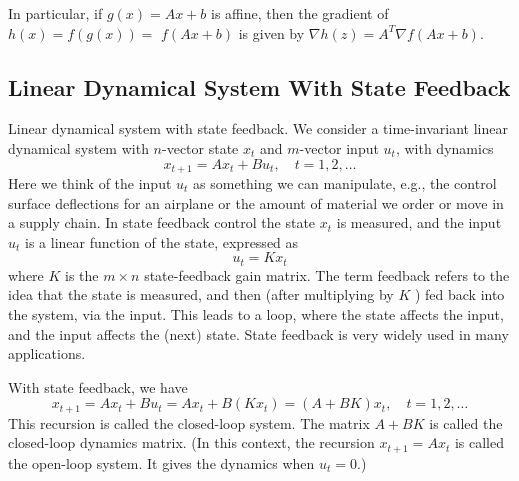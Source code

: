 In particular, if $ g(x)=A x+b $ is affine, then the gradient of $ h(x)=f(g(x))= $ $ f(A x+b) $ is given by $ \nabla h(z)=A^{T} \nabla f(A x+b) $.

\subsection{Linear Dynamical System With State Feedback}

Linear dynamical system with state feedback. We consider a time-invariant linear dynamical system with $ n $-vector state $ x_{t} $ and $ m $-vector input $ u_{t} $, with dynamics
\begin{equation}
x_{t+1}=A x_{t}+B u_{t}, \quad t=1,2, \ldots
\end{equation}
Here we think of the input $ u_{t} $ as something we can manipulate, e.g., the control surface deflections for an airplane or the amount of material we order or move in a supply chain. In state feedback control the state $ x_{t} $ is measured, and the input $ u_{t} $ is a linear function of the state, expressed as
\begin{equation}
u_{t}=K x_{t}
\end{equation}
where $ K $ is the $ m \times n $ state-feedback gain matrix. The term feedback refers to the idea that the state is measured, and then (after multiplying by $ K $ ) fed back into the system, via the input. This leads to a loop, where the state affects the input, and the input affects the (next) state. State feedback is very widely used in many applications. 

With state feedback, we have
\begin{equation}
x_{t+1}=A x_{t}+B u_{t}=A x_{t}+B\left(K x_{t}\right)=(A+B K) x_{t}, \quad t=1,2, \ldots
\end{equation}
This recursion is called the closed-loop system. The matrix $ A+B K $ is called the closed-loop dynamics matrix. (In this context, the recursion $ x_{t+1}=A x_{t} $ is called the open-loop system. It gives the dynamics when $ u_{t}=0 $.)






























